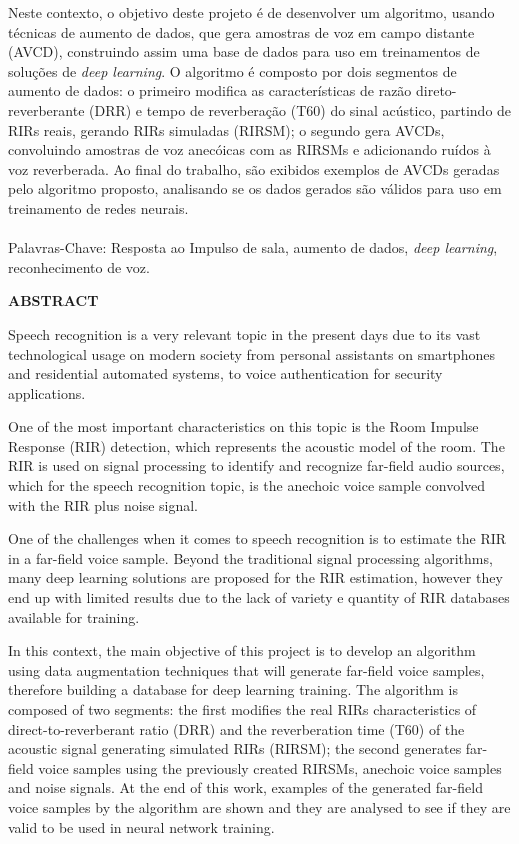 Neste contexto, o objetivo deste projeto é de desenvolver um algoritmo, usando técnicas de aumento de dados, que gera amostras de voz
em campo distante (AVCD), construindo assim uma base de dados para uso em treinamentos de soluções de \textit{deep learning}. 
O algoritmo é composto por dois segmentos de aumento de dados: o primeiro modifica as características de razão direto-reverberante (DRR)
e tempo de reverberação (T60) do sinal acústico, partindo de RIRs reais, gerando RIRs simuladas (RIRSM);
o segundo gera AVCDs, convoluindo amostras de voz anecóicas com as RIRSMs e adicionando ruídos à voz reverberada. 
Ao final do trabalho, são exibidos exemplos de AVCDs geradas pelo algoritmo proposto, analisando se os dados gerados são válidos para uso 
em treinamento de redes neurais.

\paragraph{}
\noindent Palavras-Chave: Resposta ao Impulso de sala, aumento de dados, \textit{deep learning}, reconhecimento de voz.

\pagebreak


\begin{center}
\textbf{ABSTRACT}
\end{center}
      \vspace{0.5cm}

Speech recognition is a very relevant topic in the present days due to its vast technological usage on modern society
from personal assistants on smartphones and residential automated systems, to voice authentication for security applications.

One of the most important characteristics on this topic is the Room Impulse Response (RIR) detection, which represents the
acoustic model of the room. The RIR is used on signal processing to identify and recognize far-field audio sources,
which for the speech recognition topic, is the anechoic voice sample convolved with the RIR plus noise signal.

One of the challenges when it comes to speech recognition is to estimate the RIR in a far-field voice sample.
Beyond the traditional signal processing algorithms, many deep learning solutions are proposed for the RIR estimation,
however they end up with limited results due to the lack of variety e quantity of RIR databases available for training.

In this context, the main objective of this project is to develop an algorithm using data augmentation techniques that will
generate far-field voice samples, therefore building a database for deep learning training.
The algorithm is composed of two segments: the first modifies the real RIRs characteristics of direct-to-reverberant ratio (DRR) and
the reverberation time (T60) of the acoustic signal generating simulated RIRs (RIRSM);
the second generates far-field voice samples using the previously created RIRSMs, anechoic voice samples and noise signals.
At the end of this work, examples of the generated far-field voice samples by the algorithm are shown and they are analysed to see
if they are valid to be used in neural network training.

